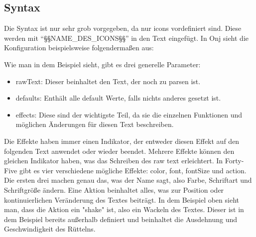 
\renewcommand{\kapitelautor}{Autor: Felix Zwickelstorfer}
\subsection{Syntax}\label{subsec:syntax}
\renewcommand{\kapitelautor}{Autor: Felix Zwickelstorfer}

Die Syntax ist nur sehr grob vorgegeben, da nur icons vordefiniert sind.
Diese werden mit ``\S\S NAME\_DES\_ICONS\S\S'' in den Text eingefügt.
In Onj sieht die Konfiguration beispielsweise folgendermaßen aus:

Wie man in dem Beispiel sieht, gibt es drei generelle Parameter:
\begin{itemize}
    \item rawText: Dieser beinhaltet den Text, der noch zu parsen ist.
    \item defaults: Enthält alle default Werte, falls nichts anderes gesetzt ist.
    \item effects: Diese sind der wichtigste Teil, da sie die einzelnen Funktionen und möglichen Änderungen für diesen Text beschreiben.
\end{itemize}


Die Effekte haben immer einen Indikator, der entweder diesen Effekt auf den folgenden Text anwendet oder wieder beendet.
Mehrere Effekte können den gleichen Indikator haben, was das Schreiben des raw text erleichtert.
In Forty-Five gibt es vier verschiedene mögliche Effekte: color, font, fontSize und action.
Die ersten drei machen genau das, was der Name sagt, also Farbe, Schriftart und Schriftgröße ändern.
Eine Aktion beinhaltet alles, was zur Position oder kontinuierlichen Veränderung des Textes beiträgt.
In dem Beispiel oben sieht man, dass die Aktion ein "shake" ist, also ein Wackeln des Textes.
Dieser ist in dem Beispiel bereits außerhalb definiert und beinhaltet die Ausdehnung und Geschwindigkeit des Rüttelns.